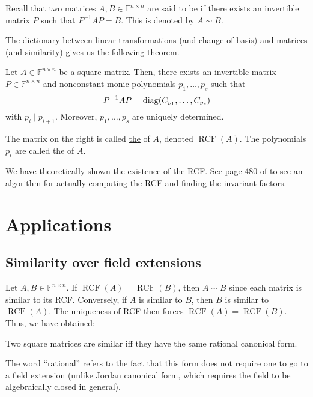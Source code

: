 \documentclass[12pt]{article}
\DeclareMathOperator{\RCF}{RCF}
\begin{document}
Recall that two matrices $A, B \in \mathbb{F}^{n \times n}$ are said to be  if there exists an invertible matrix $P$ such that $P^{-1} A P = B$. This is denoted by $A \sim B$.

The dictionary between linear transformations (and change of basis) and matrices (and similarity) gives us the following theorem.

\begin{thm}
	Let $A \in \mathbb{F}^{n \times n}$ be a square matrix. Then, there exists an invertible matrix $P \in \mathbb{F}^{n \times n}$ and nonconstant monic polynomials $p_{1}, \ldots, p_{s}$ such that
	\begin{equation} \label{eq:04}
		P^{-1} A P = \operatorname{diag}(C_{p_{1}}, \ldots, C_{p_{s}})
	\end{equation}
	with $p_{i} \mid p_{i + 1}$. Moreover, $p_{1}, \ldots, p_{s}$ are uniquely determined.

	The matrix on the right is called \underline{the}  of $A$, denoted $\RCF(A)$. The polynomials $p_{i}$ are called the  of $A$.
\end{thm}

We have theoretically shown the existence of the RCF. See page 480 of \cite{DF} to see an algorithm for actually computing the RCF and finding the invariant factors.

\section{Applications}

\subsection{Similarity over field extensions} \label{subsec:similarity-field-extensions}

Let $A, B \in \mathbb{F}^{n \times n}$. If $\RCF(A) = \RCF(B)$, then $A \sim B$ since each matrix is similar to its RCF. Conversely, if $A$ is similar to $B$, then $B$ is similar to $\RCF(A)$. The uniqueness of RCF then forces $\RCF(A) = \RCF(B)$. Thus, we have obtained:

\begin{thm}
	Two square matrices are similar iff they have the same rational canonical form.
\end{thm}

The word ``rational'' refers to the fact that this form does not require one to go to a field extension (unlike Jordan canonical form, which requires the field to be algebraically closed in general).
\end{document}
